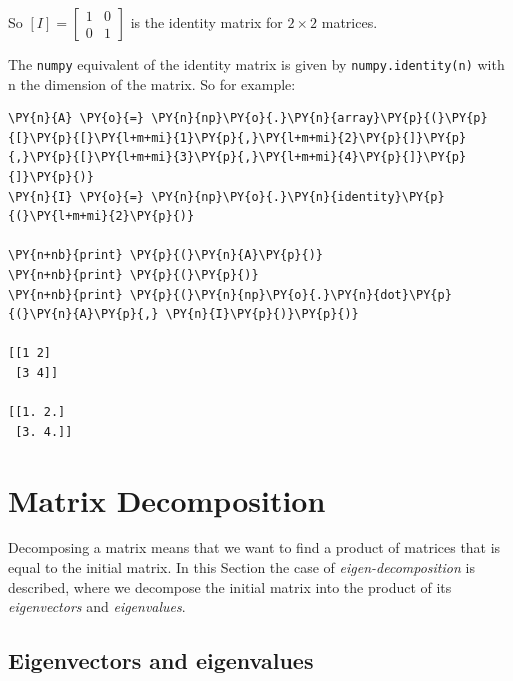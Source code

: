 So \([I] = 
\begin{bmatrix}
1 & 0 \\
0 & 1
\end{bmatrix}
\) is the identity matrix for \(2\times 2\) matrices.

The \texttt{numpy} equivalent of the identity matrix is given by
\texttt{numpy.identity(n)} with n the dimension of the matrix. So for
example:

\begin{tcolorbox}[breakable, size=fbox, boxrule=1pt, pad at break*=1mm,colback=cellbackground, colframe=cellborder]
\begin{Verbatim}[commandchars=\\\{\}]
\PY{n}{A} \PY{o}{=} \PY{n}{np}\PY{o}{.}\PY{n}{array}\PY{p}{(}\PY{p}{[}\PY{p}{[}\PY{l+m+mi}{1}\PY{p}{,}\PY{l+m+mi}{2}\PY{p}{]}\PY{p}{,}\PY{p}{[}\PY{l+m+mi}{3}\PY{p}{,}\PY{l+m+mi}{4}\PY{p}{]}\PY{p}{]}\PY{p}{)}
\PY{n}{I} \PY{o}{=} \PY{n}{np}\PY{o}{.}\PY{n}{identity}\PY{p}{(}\PY{l+m+mi}{2}\PY{p}{)}

\PY{n+nb}{print} \PY{p}{(}\PY{n}{A}\PY{p}{)}
\PY{n+nb}{print} \PY{p}{(}\PY{p}{)}
\PY{n+nb}{print} \PY{p}{(}\PY{n}{np}\PY{o}{.}\PY{n}{dot}\PY{p}{(}\PY{n}{A}\PY{p}{,} \PY{n}{I}\PY{p}{)}\PY{p}{)}

[[1 2]
 [3 4]]

[[1. 2.]
 [3. 4.]]
    \end{Verbatim}
\end{tcolorbox}

    
\section{Matrix Decomposition}
\label{eigendecomposition}

Decomposing a matrix means that we want to find a product of matrices that is equal to the initial matrix. 
In this Section the case of \emph{eigen-decomposition} is described, 
where we decompose the initial matrix into the product of its \emph{eigenvectors} and \emph{eigenvalues}.

\subsection{Eigenvectors and eigenvalues}
\label{eigenvectors-and-eigenvalues}

